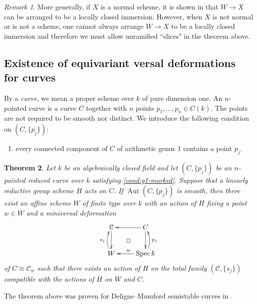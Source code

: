 \documentclass[a4paper]{amsart}
\theoremstyle{plain}
\newtheorem{theorem}{Theorem}[section]
\theoremstyle{definition}
\theoremstyle{remark}
\newtheorem{remark}[theorem]{Remark}
\numberwithin{equation}{section}
\newcommand\cC{\mathcal{C}}
\DeclareMathOperator{\Spec}{Spec}
\DeclareMathOperator{\Aut}{Aut}
\newcommand{\itemref}[1]{\eqref{#1}}
\begin{document}
\begin{remark}\label{R:luna-alper-kresch}
More generally, if $X$ is a normal scheme, it is shown in \cite[\S 2.1]{alper-kresch} that $W \to X$ can be arranged to be a locally closed immersion.  However, when $X$ is not normal or is not a scheme, one cannot always arrange $W \to X$ to be a locally closed immersion and therefore we must allow unramified ``slices" in the theorem above.
\end{remark}


\subsection{Existence of equivariant versal deformations for curves} \label{A:mv_curve}

 By a \emph{curve}, we mean a proper scheme over $k$ of pure dimension one.
 An $n$-pointed curve is a curve $C$ together with $n$ points $p_1,\dots,p_n\in
 C(k)$. The points are not required to be smooth nor distinct. We introduce
 the following condition on $(C,\{p_j\})$:

 \begin{enumerate}[label=($\dagger$),ref=$\dagger$]
   \item\label{cond:g1-marked} every connected component of $C$ of arithmetic
     genus $1$ contains a point $p_j$.
 \end{enumerate}
 
 \begin{theorem} \label{T:curves}
 Let $k$ be an algebraically closed field and let $(C,\{p_j\})$ be an
 $n$-pointed reduced curve over $k$ satisfying \itemref{cond:g1-marked}.
 Suppose that a
 linearly reductive group scheme $H$ acts on $C$.
 If $\Aut(C,\{p_j\})$ is smooth, then there exist an affine scheme $W$ of finite type
 over $k$ with an action of $H$ fixing a point $w \in W$
 and a miniversal deformation
 $$\xymatrix{
 \cC \ar[d]	 				&  C \ar[l] \ar[d]\\
 W\ar@/^/[u]^{s_j} 			&  \Spec k\ar@/_/[u]_{p_j} \ar[l]_{w}\ar@{}[ul]|\square
 }$$
 of $C \cong \cC_w$ such that there exists an 
 action of $H$ on the total family $(\cC,\{s_j\})$ compatible with the actions of $H$ on $W$
 and $C$.
 \end{theorem}
 
 The theorem above was proven for Deligne--Mumford semistable curves in \cite{alper-kresch}.
\end{document}
